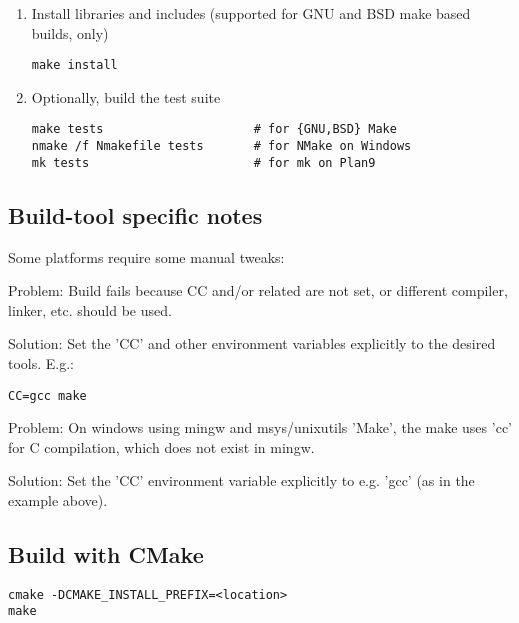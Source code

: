 \begin{enumerate}
\item Install libraries and includes (supported for GNU and BSD make based builds, only)
\begin{lstlisting}
make install 
\end{lstlisting}

\item Optionally, build the test suite
\begin{lstlisting}
make tests                     # for {GNU,BSD} Make
nmake /f Nmakefile tests       # for NMake on Windows
mk tests                       # for mk on Plan9
\end{lstlisting}%
\end{enumerate}

\subsection{Build-tool specific notes}

Some platforms require some manual tweaks:

Problem: Build fails because CC and/or related are not set, or different compiler,
linker, etc. should be used.

Solution: Set the 'CC' and other environment variables explicitly to the desired
tools. E.g.:

\begin{lstlisting}
CC=gcc make
\end{lstlisting}


Problem: On windows using mingw and msys/unixutils 'Make', the make uses
'cc' for C compilation, which does not exist in mingw.

Solution: Set the 'CC' environment variable explicitly to e.g. 'gcc' (as in the
example above).

\subsection{Build with CMake}

\begin{lstlisting}
cmake -DCMAKE_INSTALL_PREFIX=<location>
make
\end{lstlisting}

